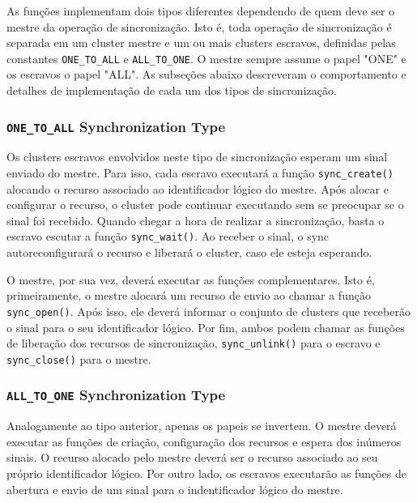 		As funções implementam dois tipos diferentes dependendo de quem
		deve ser o mestre da operação de sincronização.
		Isto é, toda operação de sincronização é separada em um cluster mestre
		e um ou mais clusters escravos, definidas pelas constantes
		\texttt{ONE\_TO\_ALL} e \texttt{ALL\_TO\_ONE}.
		O mestre sempre assume o papel "ONE" e os escravos o papel "ALL".
		As subseções abaixo descreveram o comportamento e detalhes de implementação
		de cada um dos tipos de sincronização.

			\subsubsection*{\texttt{ONE\_TO\_ALL} Synchronization Type}

				Os clusters escravos envolvidos neste tipo de sincronização esperam
				um sinal enviado do mestre.
				Para isso, cada escravo executará a função \texttt{sync\_create()}
				alocando o recurso associado ao identificador lógico do mestre.
				Após alocar e configurar o recurso, o cluster pode continuar
				executando sem se preocupar se o sinal foi recebido.
				Quando chegar a hora de realizar a sincronização, basta o escravo
				escutar a função \texttt{sync\_wait()}.
				Ao receber o sinal, o sync autoreconfigurará o recurso e liberará o cluster,
				caso ele esteja esperando.

				O mestre, por sua vez, deverá executar as funções complementares.
				Isto é, primeiramente, o mestre alocará um recurso de envio
				ao chamar a função \texttt{sync\_open()}.
				Após isso, ele deverá informar o conjunto de clusters que
				receberão o sinal para o seu identificador lógico.
				Por fim, ambos podem chamar as funções de liberação dos recursos
				de sincronização, \texttt{sync\_unlink()} para o escravo e
				\texttt{sync\_close()} para o mestre.

			\subsubsection*{\texttt{ALL\_TO\_ONE} Synchronization Type}

				Analogamente ao tipo anterior, apenas os papeis se invertem.
				O mestre deverá executar as funções de criação, configuração dos
				recursos e espera dos inúmeros sinais.
				O recurso alocado pelo mestre deverá ser o recurso associado ao
				seu próprio identificador lógico.
				Por outro lado, os escravos executarão as funções de abertura
				e envio de um sinal para o indentificador lógico do mestre.

